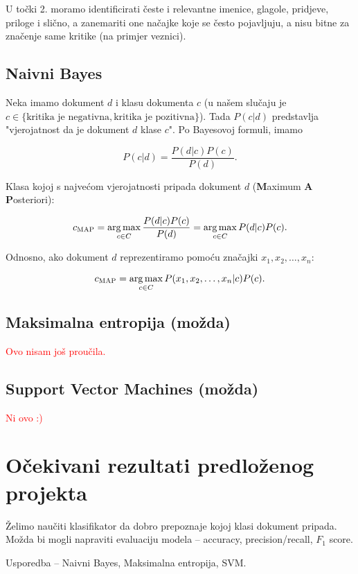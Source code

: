 \documentclass[12pt,a4paper,titlepage]{article}
\DeclareMathOperator*{\argmax}{arg\,max}
\begin{document}
U točki 2. moramo identificirati česte i relevantne imenice, glagole, pridjeve, priloge i slično, a zanemariti one načajke koje se često pojavljuju, a nisu bitne za značenje same kritike (na primjer veznici).

\subsection{Naivni Bayes}

Neka imamo dokument $d$ i klasu dokumenta $c$ (u našem slučaju je $c \in \{\text{kritika je negativna}, \text{kritika je pozitivna}\}$). Tada $P(c|d)$ predstavlja "vjerojatnost da je dokument $d$ klase $c$". Po Bayesovoj formuli, imamo

\[
P(c|d) = \frac{P(d|c)P(c)}{P(d)}.
\]

Klasa kojoj s najvećom vjerojatnosti pripada dokument $d$ (\textbf{M}aximum \textbf{A} \textbf{P}osteriori):

\[
c_{\textsc{MAP}}
= \argmax_{c \in C} \frac{P(d|c)P(c)}{P(d)}
= \argmax_{c \in C} P(d|c)P(c).
\]

Odnosno, ako dokument $d$ reprezentiramo pomoću značajki $x_1, x_2, \ldots, x_n$:

\[
c_{\textsc{MAP}}
= \argmax_{c \in C} P(x_1, x_2, \ldots, x_n|c)P(c).
\]

\subsection{Maksimalna entropija (možda)}

\textcolor{red}{Ovo nisam još proučila.}

\subsection{Support Vector Machines (možda)}

\textcolor{red}{Ni ovo :)}

\section{Očekivani rezultati predloženog projekta}

Želimo naučiti klasifikator da dobro prepoznaje kojoj klasi dokument pripada. Možda bi mogli napraviti evaluaciju modela -- accuracy, precision/recall, $F_1$ score.

Usporedba -- Naivni Bayes, Maksimalna entropija, SVM.

\newpage

\nocite{*}



\end{document}
